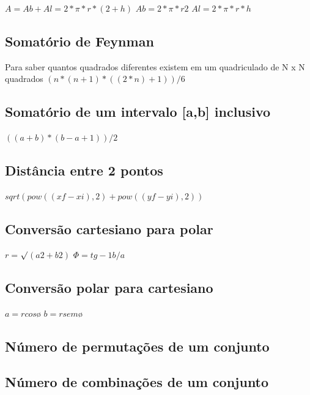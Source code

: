 \documentclass[a4paper,12pt]{article}
\begin{document}
\(A = Ab + Al = 2*\pi*r*(2+h)\) \newline
\(Ab = 2*\pi*r2\) \newline
\(Al = 2*\pi*r*h\)

\subsection{Somatório de Feynman}
Para saber quantos quadrados diferentes existem em um quadriculado de N x N quadrados \newline
\((n*(n+1)*((2*n)+1))/6\)

\subsection{Somatório de um intervalo [a,b] inclusivo}

\(((a + b) * (b - a + 1)) / 2\)

\subsection{Distância entre 2 pontos}

\(sqrt(pow((xf-xi),2) + pow((yf-yi),2))\)

\subsection{Conversão cartesiano para polar}

\( r = \)$\surd$\((a 2 + b2)\)\newline
\(\Phi = tg-1 b/a\)

\subsection{Conversão polar para cartesiano}

\( a = r cos ø\) \newline
\( b = r sem ø\)

\subsection{Número de permutações de um conjunto}


\subsection{Número de combinações de um conjunto}
\end{document}
